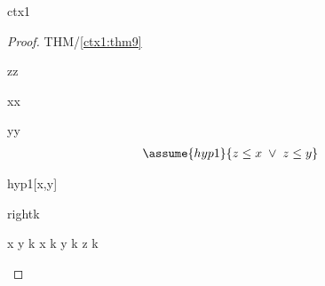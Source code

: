 \documentclass[12pt]{amsart}
\begin{document}
\begin{context}{ctx1}
\begin{proof}{THM/\ref{ctx1:thm9}}
	\begin{free:var}{z}{z}
	\begin{free:var}{x}{x}
	\begin{free:var}{y}{y}
	\begin{align}
	\assume{hyp1}{ z \le x \1\lor z\le y } 
	\end{align}
\begin{by:symmetry}{hyp1}{[x,y]}
\begin{indirect:inequality}{right}{\le}{k}
\begin{calculation}
		x \uparrow y \1\le k
	\hint{=}{ \eqref{ctx1:axm1} }
		x \le k \1\land y \le k
	\hint{=}{ }
		z \le k
\end{calculation}
\end{indirect:inequality}
\end{by:symmetry}
	\end{free:var}
	\end{free:var}
	\end{free:var}
\end{proof}

\end{context}
\end{document}

